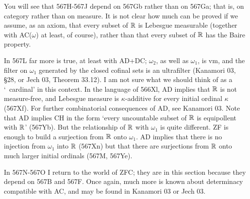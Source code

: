 {You will see that 567H-567J %
depend on 567Gb rather than on 567Ga;  that is, on category rather than on
measure.   It is not clear how much can be proved if we assume, as an
axiom, that every subset of $\Bbb R$ is Lebesgue measurable (together with
AC($\omega$) at least, of course), rather than that every subset of
$\Bbb R$ has the Baire property.

In 567L far more is true, at least with AD+DC;  $\omega_2$, as
well as $\omega_1$,
is \2vm, and the filter on $\omega_1$ generated by the closed
cofinal sets is an ultrafilter ({\smc Kanamori 03}, \S28, or
{\smc Jech 03}, Theorem 33.12).
I am not sure what we should think of as a `\rvm\ cardinal' in this
context.   In the language of 566Xl, AD implies that $\Bbb R$ is not
measure-free, and Lebesgue measure is $\kappa$-additive for every initial
ordinal $\kappa$ (567Xf).
For further combinatorial consequences of AD, see {\smc Kanamori 03}.
Note that AD implies CH in the form `every uncountable subset of $\Bbb R$
is equipollent with $\Bbb R$' (567Yb).   But the relationship of $\Bbb R$
with $\omega_1$ is quite different.   ZF is enough to build a surjection
from $\Bbb R$ onto $\omega_1$.   AD implies that there is no injection
from $\omega_1$ into $\Bbb R$ (567Xn) but that
there are surjections from $\Bbb R$ onto much larger initial ordinals
(567M, 567Ye).

In 567N-567O I return to the world of ZFC;  they are in this section
because they depend on 567B and 567F.   Once again, much more is known
about determinacy compatible with AC, and
may be found in {\smc Kanamori 03} or {\smc Jech 03}.

}%

\discrpage
